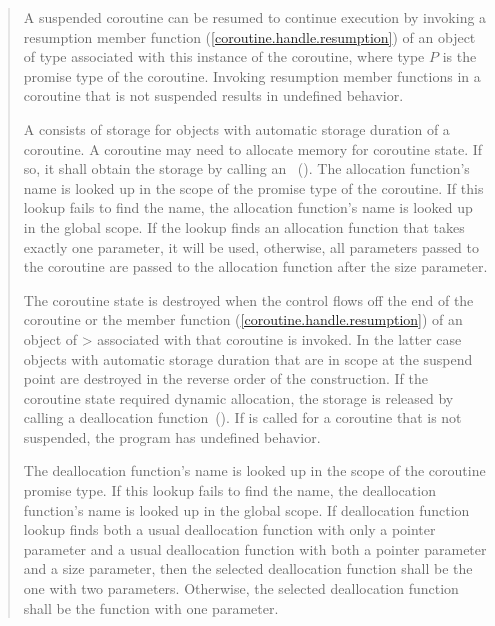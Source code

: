 \begin{quote}

\pnum
A suspended coroutine can be resumed
to continue execution by invoking
a resumption member function (\ref{coroutine.handle.resumption}) of an object of  type
associated with this instance of the coroutine, where type $P$
is the promise type of the coroutine. Invoking resumption member functions in a coroutine that is not suspended results in undefined behavior. 

\pnum
A  consists of 
storage for objects with automatic storage duration of a coroutine.
A coroutine may need to allocate
memory for coroutine state. If so, it shall obtain the storage by calling an
~().
The allocation function's name is looked up in the scope of the promise type of the coroutine. If this lookup fails to find the name, the allocation function's name is looked up in the global scope. If the lookup finds an allocation function that takes exactly one parameter, it will be used, otherwise, all parameters passed to the coroutine are passed to the allocation function after the size parameter.


\pnum
The coroutine state is destroyed when
the control flows off the end of the coroutine or
the  member function (\ref{coroutine.handle.resumption}) of an object of > associated with that coroutine is invoked. In the latter case objects with automatic storage duration that are in scope
at the suspend point are destroyed in the reverse order of the construction. If the coroutine state required dynamic allocation, the storage is released by calling a deallocation
function~(). If  is called for a coroutine that is not suspended, the program has undefined behavior.

\pnum
The deallocation function's name is looked up in the scope of the coroutine promise type. If this lookup fails to find the name, the deallocation function's name is looked up in the global scope. If deallocation function lookup finds both a usual deallocation function with only a pointer parameter and a usual deallocation function with both a pointer parameter and a size parameter, then the selected deallocation function shall be the one with two parameters. Otherwise, the selected deallocation function shall be the function with one parameter. 


\end{quote}
